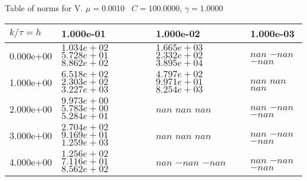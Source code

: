 \begin{center}
Table of norms for V. $\mu = 0.0010$ \, $C = 100.0000$, $\gamma = 1.0000$
  
\begin{tabular}{|p{1in}|p{1in}|p{1in}|p{1in}|} \hline
$k / \tau = h$ &1.000e-01 &1.000e-02 &1.000e-03 \\ \hline 
0.000e+00 & $1.034e+02$  $5.728e+01$  $8.862e+02$  & $1.665e+03$  $2.332e+02$  $3.895e+04$  & $nan$  $-nan$  $-nan$  \\ \hline 
1.000e+00 & $6.518e+02$  $2.303e+02$  $3.227e+03$  & $4.797e+02$  $9.971e+01$  $8.254e+03$  & $nan$  $nan$  $nan$  \\ \hline 
2.000e+00 & $9.973e+00$  $5.783e+00$  $5.284e+01$  & $nan$  $nan$  $nan$  & $nan$  $-nan$  $-nan$  \\ \hline 
3.000e+00 & $2.704e+02$  $9.169e+01$  $1.259e+03$  & $nan$  $nan$  $nan$  & $nan$  $-nan$  $-nan$  \\ \hline 
4.000e+00 & $1.256e+02$  $7.116e+01$  $8.562e+02$  & $nan$  $-nan$  $-nan$  & $nan$  $-nan$  $-nan$  \\ \hline 

\end{tabular}\\[20pt]
\end{center}
